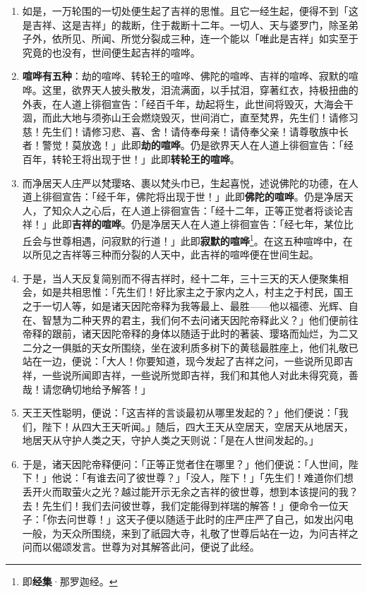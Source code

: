 \begin{enumerate}
\item 如是，一万轮围的一切处便生起了吉祥的思惟。且它一经生起，便得不到「这是吉祥、这是吉祥」的裁断，住于裁断十二年。一切人、天与婆罗门，除圣弟子外，依所见、所闻、所觉分裂成三种，连一个能以「唯此是吉祥」如实至于究竟的也没有，世间便生起吉祥的喧哗。
\item \textbf{喧哗有五种}：劫的喧哗、转轮王的喧哗、佛陀的喧哗、吉祥的喧哗、寂默的喧哗。这里，欲界天人披头散发，泪流满面，以手拭泪，穿著红衣，持极扭曲的外表，在人道上徘徊宣告：「经百千年，劫起将生，此世间将毁灭，大海会干涸，而此大地与须弥山王会燃烧毁灭，世间消亡，直至梵界，先生们！请修习慈！先生们！请修习悲、喜、舍！请侍奉母亲！请侍奉父亲！请尊敬族中长者！警觉！莫放逸！」此即\textbf{劫的喧哗}。仍是欲界天人在人道上徘徊宣告：「经百年，转轮王将出现于世！」此即\textbf{转轮王的喧哗}。
\item 而净居天人庄严以梵璎珞、裹以梵头巾已，生起喜悦，述说佛陀的功德，在人道上徘徊宣告：「经千年，佛陀将出现于世！」此即\textbf{佛陀的喧哗}。仍是净居天人，了知众人之心后，在人道上徘徊宣告：「经十二年，正等正觉者将谈论吉祥！」此即\textbf{吉祥的喧哗}。仍是净居天人在人道上徘徊宣告：「经七年，某位比丘会与世尊相遇，问寂默的行道！」此即\textbf{寂默的喧哗}\footnote{即\textbf{经集}·那罗迦经。}。在这五种喧哗中，在以所见之吉祥等三种而分裂的人天中，此吉祥的喧哗便在世间生起。
\item 于是，当人天反复简别而不得吉祥时，经十二年，三十三天的天人便聚集相会，如是共相思惟：「先生们！好比家主之于家内之人，村主之于村民，国王之于一切人等，如是诸天因陀帝释为我等最上、最胜——他以福德、光辉、自在、智慧为二种天界的君主，我们何不去问诸天因陀帝释此义？」他们便前往帝释的跟前，诸天因陀帝释的身体以随适于此时的著装、璎珞而灿烂，为二又二分之一俱胝的天女所围绕，坐在波利质多树下的黄毯最胜座上，他们礼敬已站在一边，便说：「大人！你要知道，现今发起了吉祥之问，一些说所见即吉祥，一些说所闻即吉祥，一些说所觉即吉祥，我们和其他人对此未得究竟，善哉！请您确切地给予解答！」
\item 天王天性聪明，便说：「这吉祥的言谈最初从哪里发起的？」他们便说：「我们，陛下！从四大王天听闻。」随后，四大王天从空居天，空居天从地居天，地居天从守护人类之天，守护人类之天则说：「是在人世间发起的。」
\item 于是，诸天因陀帝释便问：「正等正觉者住在哪里？」他们便说：「人世间，陛下！」他说：「有谁去问了彼世尊？」「没人，陛下！」「先生们！难道你们想丢开火而取萤火之光？越过能开示无余之吉祥的彼世尊，想到本该提问的我？去！先生们！我们去问彼世尊，我们定能得到祥瑞的解答！」便命令一位天子：「你去问世尊！」这天子便以随适于此时的庄严庄严了自己，如发出闪电一般，为天众所围绕，来到了祇园大寺，礼敬了世尊后站在一边，为问吉祥之问而以偈颂发言。世尊为对其解答此问，便说了此经。\end{enumerate}

